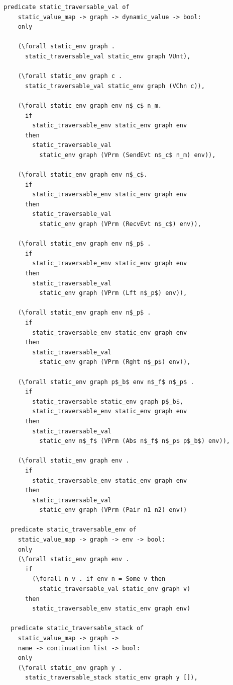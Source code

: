 \documentclass{article}
\begin{document}
\begin{lstlisting}[language=logic, mathescape]
  predicate static_traversable_val of
    static_value_map -> graph -> dynamic_value -> bool:
    only

    (\forall static_env graph .
      static_traversable_val static_env graph VUnt), 

    (\forall static_env graph c .
      static_traversable_val static_env graph (VChn c)),

    (\forall static_env graph env n$_c$ n_m.
      if
        static_traversable_env static_env graph env 
      then 
        static_traversable_val
          static_env graph (VPrm (SendEvt n$_c$ n_m) env)),

    (\forall static_env graph env n$_c$.
      if
        static_traversable_env static_env graph env 
      then
        static_traversable_val
          static_env graph (VPrm (RecvEvt n$_c$) env)),

    (\forall static_env graph env n$_p$ .
      if
        static_traversable_env static_env graph env 
      then
        static_traversable_val
          static_env graph (VPrm (Lft n$_p$) env)),

    (\forall static_env graph env n$_p$ .
      if
        static_traversable_env static_env graph env
      then
        static_traversable_val
          static_env graph (VPrm (Rght n$_p$) env)),

    (\forall static_env graph p$_b$ env n$_f$ n$_p$ .
      if
        static_traversable static_env graph p$_b$, 
        static_traversable_env static_env graph env
      then
        static_traversable_val
          static_env n$_f$ (VPrm (Abs n$_f$ n$_p$ p$_b$) env)),

    (\forall static_env graph env . 
      if
        static_traversable_env static_env graph env
      then
        static_traversable_val
          static_env graph (VPrm (Pair n1 n2) env))

  predicate static_traversable_env of
    static_value_map -> graph -> env -> bool: 
    only 
    (\forall static_env graph env .
      if
        (\forall n v . if env n = Some v then
          static_traversable_val static_env graph v)
      then
        static_traversable_env static_env graph env) 

  predicate static_traversable_stack of
    static_value_map -> graph ->
    name -> continuation list -> bool:
    only
    (\forall static_env graph y .
      static_traversable_stack static_env graph y []),


\end{lstlisting}
\end{document}
